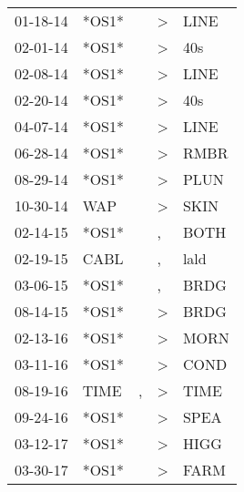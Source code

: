 \begin{supertabular}{p{0.07\textwidth}p{0.06\textwidth}p{0.02\textwidth}p{0.02\textwidth}p{0.06\textwidth}}
 01-18-14\textsuperscript{} &                   *OS1* &    &  \textgreater &  LINE\textsuperscript{} \\
 02-01-14\textsuperscript{} &                   *OS1* &    &  \textgreater &   40s\textsuperscript{} \\
 02-08-14\textsuperscript{} &                   *OS1* &    &  \textgreater &  LINE\textsuperscript{} \\
 02-20-14\textsuperscript{} &                   *OS1* &    &  \textgreater &   40s\textsuperscript{} \\
 04-07-14\textsuperscript{} &                   *OS1* &    &  \textgreater &  LINE\textsuperscript{} \\
 06-28-14\textsuperscript{} &                   *OS1* &    &  \textgreater &  RMBR\textsuperscript{} \\
 08-29-14\textsuperscript{} &                   *OS1* &    &  \textgreater &  PLUN\textsuperscript{} \\
 10-30-14\textsuperscript{} &   WAP\textsuperscript{} &    &  \textgreater &  SKIN\textsuperscript{} \\
 02-14-15\textsuperscript{} &                   *OS1* &    &             , &  BOTH\textsuperscript{} \\
 02-19-15\textsuperscript{} &  CABL\textsuperscript{} &    &             , &  lald\textsuperscript{} \\
 03-06-15\textsuperscript{} &                   *OS1* &    &             , &  BRDG\textsuperscript{} \\
 08-14-15\textsuperscript{} &                   *OS1* &    &  \textgreater &  BRDG\textsuperscript{} \\
 02-13-16\textsuperscript{} &                   *OS1* &    &  \textgreater &  MORN\textsuperscript{} \\
 03-11-16\textsuperscript{} &                   *OS1* &    &  \textgreater &  COND\textsuperscript{} \\
 08-19-16\textsuperscript{} &  TIME\textsuperscript{} &  , &  \textgreater &  TIME\textsuperscript{} \\
 09-24-16\textsuperscript{} &                   *OS1* &    &  \textgreater &  SPEA\textsuperscript{} \\
 03-12-17\textsuperscript{} &                   *OS1* &    &  \textgreater &  HIGG\textsuperscript{} \\
 03-30-17\textsuperscript{} &                   *OS1* &    &  \textgreater &  FARM\textsuperscript{} \\

\end{supertabular}
